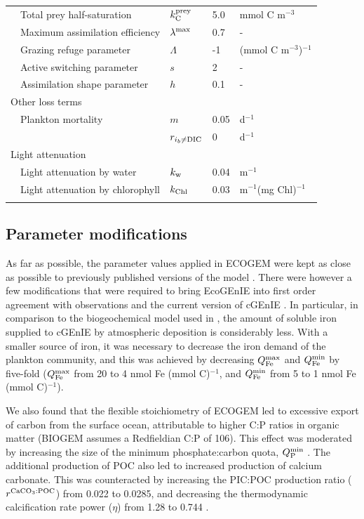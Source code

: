\documentclass[gmd, manuscript]{copernicus}
\begin{document}
{\begin{table}[htp!]
\begin{tabular*}{1.0\textwidth}{@{\extracolsep{\fill}}lllll}
& Total prey half-saturation & $k^{\rm prey}_{\rm C}$ & 5.0 & mmol C m$^{-3}$ \\ 
& Maximum assimilation efficiency & $\lambda^{\rm max}$ & 0.7 & - \\ 
& Grazing refuge parameter & $\Lambda$ & -1 & (mmol C m$^{-3}$)$^{-1}$ \\ 
& Active switching parameter & $s$ & 2 & - \\ 
& Assimilation shape parameter & $h$ & 0.1 & - \\ 
\multicolumn{5}{l}{{Other loss terms}}\\ 
& Plankton mortality & $m$ & 0.05 & d$^{-1}$ \\ 
& 					& $r_{i_b\neq{\rm DIC}}$ & 0 & d$^{-1}$ \\ 
\multicolumn{4}{l}{{Light attenuation}} \\ 
&Light attenuation by water & $k_{\rm w}$ & 0.04 & m$^{-1}$ \\ 
&Light attenuation by chlorophyll & $k_{\rm Chl}$ & 0.03 & m$^{-1}$(mg Chl)$^{-1}$ \\ [+1ex]
\hline\\ [-1ex]
\end{tabular*}
\label{Size_independent}
\end{table}


\subsection{Parameter modifications}

As far as possible, the parameter values applied in ECOGEM were kept as close as possible to previously published versions of the model \citep{Ward:2016}. There were however a few modifications that were required to bring EcoGEnIE into first order agreement with observations and the current version of cGEnIE \citep{Ridgwell:prep}. In particular, in comparison to the biogeochemical model used in \citet{Ward:2016}, the amount of soluble iron supplied to cGEnIE by atmospheric deposition is considerably less. With a smaller source of iron, it was necessary to decrease the iron demand of the plankton community, and this was achieved by decreasing $Q^{\rm max}_{\rm Fe}$ and $Q^{\rm min}_{\rm Fe}$ by five-fold ($Q^{\rm max}_{\rm Fe}$ from 20 to 4 nmol Fe (mmol C)$^{-1}$, and $Q^{\rm min}_{\rm Fe}$ from 5 to 1 nmol Fe (mmol C)$^{-1}$).

We also found that the flexible stoichiometry of ECOGEM led to excessive export of carbon from the surface ocean, attributable to higher C:P ratios in organic matter (BIOGEM assumes a Redfieldian C:P of 106). This effect was moderated by increasing the size of the minimum phosphate:carbon quota, $Q^{\rm min}_{\rm P}$ \citep[relative to][]{Ward:2012}. The additional production of POC also led to increased production of calcium carbonate. This was counteracted by increasing the PIC:POC production ratio ($r^{\rm CaCO_3:POC}$) from 0.022 to 0.0285, and decreasing the thermodynamic calcification rate power ($\eta$) from 1.28 to 0.744 \citep{Ridgwell:2007}.

}
\end{document}
